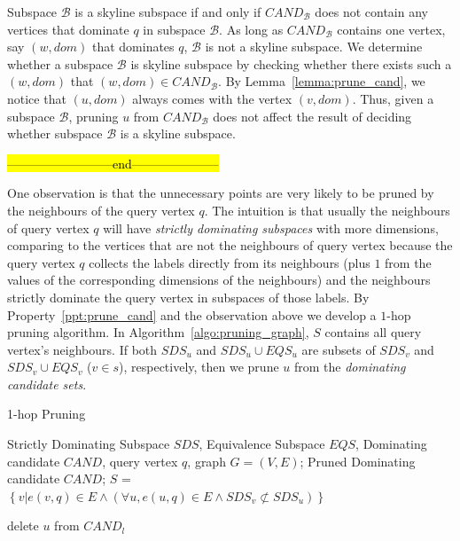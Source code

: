 Subspace $\mathcal{B}$ is a skyline subspace if and only if $\mathit{CAND}_\mathcal{B}$ does not contain any vertices that dominate $q$ in subspace $\mathcal{B}$. As long as $\mathit{CAND}_\mathcal{B}$ contains one vertex, say $(w, dom)$ that dominates $q$, $\mathcal{B}$ is not a skyline subspace. We determine whether a subspace $\mathcal{B}$ is skyline subspace by checking whether there exists such a $(w, dom)$ that $(w, dom) \in \mathit{CAND}_\mathcal{B}$. By Lemma~\ref{lemma:prune_cand}, we notice that $(u, dom)$ always comes with the vertex $(v, dom)$. Thus, given a subspace $\mathcal{B}$, pruning $u$ from $\mathit{CAND}_\mathcal{B}$ does not affect the result of deciding whether subspace $\mathcal{B}$ is a skyline subspace.


\hl{--------------------------end---------------------}

One observation is that the unnecessary points are very likely to be pruned by the neighbours of the query vertex $q$. The intuition is that usually the neighbours of query vertex $q$ will have \emph{strictly dominating subspaces} with more dimensions, comparing to the vertices that are not the neighbours of query vertex because the query vertex $q$ collects the labels directly from its neighbours (plus $1$ from the values of the corresponding dimensions of the neighbours) and the neighbours strictly dominate the query vertex in subspaces of those labels.
By Property~\ref{ppt:prune_cand} and the observation above we develop a $1$-hop pruning algorithm. In Algorithm~\ref{algo:pruning_graph}, $S$ contains all query vertex's neighbours. If both $SDS_u$ and $SDS_u \cup EQS_u$ are subsets of $SDS_v$ and $SDS_v \cup EQS_v$ ($v \in s$), respectively, then we prune $u$ from the \emph{dominating candidate sets}.

\begin{algorithm}[H]
  \caption{1-hop Pruning}
  \label{algo:pruning_graph}
  \begin{algorithmic}[1]
  \show\LOOP
    \REQUIRE Strictly Dominating Subspace $\mathit{SDS}$, Equivalence Subspace $\mathit{EQS}$, Dominating candidate $\mathit{CAND}$, query vertex $q$, graph $G=(V, E)$;
    \ENSURE Pruned Dominating candidate $\mathit{CAND}$;
    \STATE $S$ = $\left\{v|e(v, q) \in E \wedge (\forall u, e(u, q) \in E \wedge SDS_v \not\subset SDS_u)\right\}$
    
                    \STATE delete $u$ from $\mathit{CAND}_l$
                \ENDIF
                
            \ENDFOR
        \ENDFOR
    \ENDFOR
  \end{algorithmic}
\end{algorithm}

